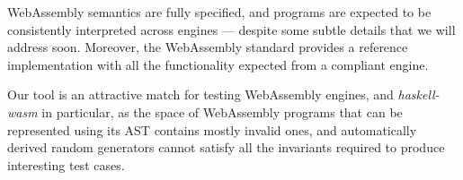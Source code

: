 \documentclass[sigconf, anonymous, review]{acmart}
\begin{document}
WebAssembly semantics are fully specified, and programs are expected to be
consistently interpreted across engines --- despite some subtle details that we
will address soon.
%
Moreover, the WebAssembly standard provides a reference implementation with all
the functionality expected from a compliant engine.
%


Our tool is an attractive match for testing WebAssembly engines, and
\textit{haskell-wasm} in particular, as the space of WebAssembly programs that
can be represented using its AST contains mostly invalid ones, and automatically
derived random generators cannot satisfy all the invariants required to produce
interesting test cases.
\end{document}
